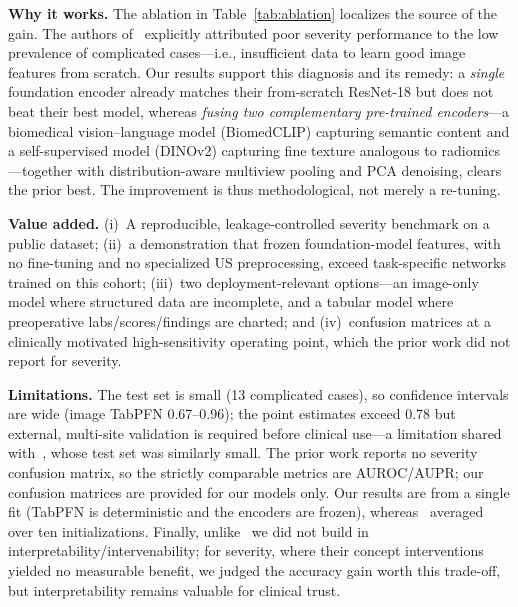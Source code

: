 \documentclass[journal]{IEEEtran}
\begin{document}
\textbf{Why it works.} The ablation in Table~\ref{tab:ablation} localizes the source of
the gain. The authors of~\cite{marcinkevics2024interpretable} explicitly attributed poor
severity performance to the low prevalence of complicated cases---i.e., insufficient
data to learn good image features from scratch. Our results support this diagnosis and
its remedy: a \emph{single} foundation encoder already matches their from-scratch
ResNet-18 but does not beat their best model, whereas \emph{fusing two complementary
pre-trained encoders}---a biomedical vision--language model (BiomedCLIP) capturing
semantic content and a self-supervised model (DINOv2) capturing fine texture analogous
to radiomics---together with distribution-aware multiview pooling and PCA denoising,
clears the prior best. The improvement is thus methodological, not merely a re-tuning.

\textbf{Value added.} (i)~A reproducible, leakage-controlled severity benchmark on a
public dataset; (ii)~a demonstration that frozen foundation-model features, with no
fine-tuning and no specialized US preprocessing, exceed task-specific networks trained
on this cohort; (iii)~two deployment-relevant options---an image-only model where
structured data are incomplete, and a tabular model where preoperative
labs/scores/findings are charted; and (iv)~confusion matrices at a clinically motivated
high-sensitivity operating point, which the prior work did not report for severity.

\textbf{Limitations.} The test set is small (13 complicated cases), so confidence
intervals are wide (image TabPFN 0.67--0.96); the point estimates exceed 0.78 but
external, multi-site validation is required before clinical use---a limitation shared
with~\cite{marcinkevics2024interpretable}, whose test set was similarly small. The prior
work reports no severity confusion matrix, so the strictly comparable metrics are
AUROC/AUPR; our confusion matrices are provided for our models only. Our results are from
a single fit (TabPFN is deterministic and the encoders are frozen),
whereas~\cite{marcinkevics2024interpretable} averaged over ten initializations. Finally,
unlike~\cite{marcinkevics2024interpretable} we did not build in
interpretability/intervenability; for severity, where their concept interventions
yielded no measurable benefit, we judged the accuracy gain worth this trade-off, but
interpretability remains valuable for clinical trust.

\end{document}
